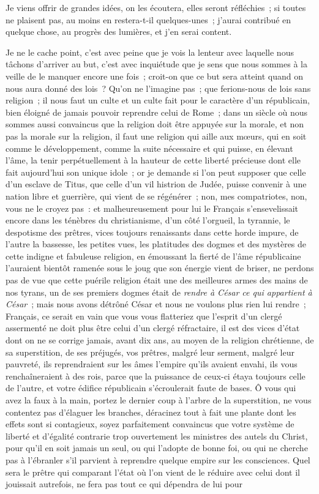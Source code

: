 \documentclass[french,twoside]{book} %
\begin{document}
\noindent Je viens offrir de grandes idées, on les écoutera, elles seront réfléchies ; si toutes ne plaisent pas, au moins en restera-t-il quelques-unes ; j’aurai contribué en quelque chose, au progrès des lumières, et j’en serai content.\par
Je ne le cache point, c’est avec peine que je vois la lenteur avec laquelle nous tâchons d’arriver au but, c’est avec inquiétude que je sens que nous sommes à la veille de le manquer encore une fois ; croit-on que ce but sera atteint quand on nous aura donné des lois ? Qu’on ne l’imagine pas ; que ferions-nous de lois sans religion ; il nous faut un culte et un culte fait pour le caractère d’un républicain, bien éloigné de jamais pouvoir reprendre celui de Rome ; dans un siècle où nous sommes aussi convaincus que la religion doit être appuyée sur la morale, et non pas la morale sur la religion, il faut une religion qui aille aux mœurs, qui en soit comme le développement, comme la suite nécessaire et qui puisse, en élevant l’âme, la tenir perpétuellement à la hauteur de cette liberté précieuse dont elle fait aujourd’hui son unique idole ; or je demande si l’on peut supposer que celle d’un esclave de Titus, que celle d’un vil histrion de Judée, puisse convenir à une nation libre et guerrière, qui vient de se régénérer ; non, mes compatriotes, non, vous ne le croyez pas : et malheureusement pour lui le Français s’ensevelissait encore dans les ténèbres du christianisme, d’un côté l’orgueil, la tyrannie, le despotisme des prêtres, vices toujours renaissants dans cette horde impure, de l’autre la bassesse, les petites vues, les platitudes des dogmes et des mystères de cette indigne et fabuleuse religion, en émoussant la fierté de l’âme républicaine l’auraient bientôt ramenée sous le joug que son énergie vient de briser, ne perdons pas de vue que cette puérile religion était une des meilleures armes des mains de nos tyrans, un de ses premiers dogmes était de {\itshape rendre à César ce qui appartient à César} ; mais nous avons détrôné César et nous ne voulons plus rien lui rendre ; Français, ce serait en vain que vous vous flatteriez que l’esprit d’un clergé assermenté ne doit plus être celui d’un clergé réfractaire, il est des vices d’état dont on ne se corrige jamais, avant dix ans, au moyen de la religion chrétienne, de sa superstition, de ses préjugés, vos prêtres, malgré leur serment, malgré leur pauvreté, ils reprendraient sur les âmes l’empire qu’ils avaient envahi, ils vous renchaîneraient à des rois, parce que la puissance de ceux-ci étaya toujours celle de l’autre, et votre édifice républicain s’écroulerait faute de bases. Ô vous qui avez la faux à la main, portez le dernier coup à l’arbre de la superstition, ne vous contentez pas d’élaguer les branches, déracinez tout à fait une plante dont les effets sont si contagieux, soyez parfaitement convaincus que votre système de liberté et d’égalité contrarie trop ouvertement les ministres des autels du Christ, pour qu’il en soit jamais un seul, ou qui l’adopte de bonne foi, ou qui ne cherche pas à l’ébranler s’il parvient à reprendre quelque empire sur les consciences. Quel sera le prêtre qui comparant l’état où l’on vient de le réduire avec celui dont il jouissait autrefois, ne fera pas tout ce qui dépendra de lui pour 
\end{document}
